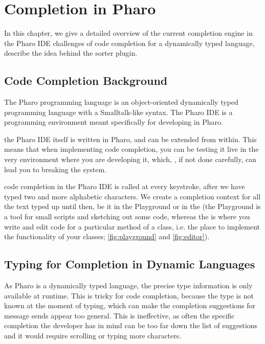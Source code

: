 \chapter{Completion in Pharo}
\label{chap:PharoCompletion}

In this chapter, we give a detailed overview of  the current completion engine in the Pharo IDE challenges of code completion for a dynamically typed language,  describe the idea behind the sorter plugin.

\section{Code Completion Background}
\label{sec:PharoCompletion-Background}
 The Pharo programming language is an object-oriented dynamically typed programming language with a Smalltalk-like syntax. The Pharo IDE is a programming environment meant specifically for developing in Pharo. 

the Pharo IDE itself is written in Pharo, and can be extended from within. This means that when implementing code completion, you can be testing it live in the very environment where you are developing it, which, , if not done carefully, can lead you to breaking the system. 

 code completion in the Pharo IDE is called at every keystroke, after we have typed two and more alphabetic characters. We create a completion context for all the text typed up until then, be it in the Playground or in the  (the Playground is a tool for  small scripts and sketching out some code, whereas the  is where you write and edit code for a particular method of a class, i.e. the place to implement the functionality of your classes;  \ref{fig:playground} and \ref{fig:editor}).

\section{Typing for Completion in Dynamic Languages}
\label{sec:PharoCompletion-Typing}
As Pharo is a dynamically typed language, the precise type information is only available at runtime. This is  tricky for code completion, because the type is not known at the moment of typing, which can make the completion suggestions for message sends appear too general. This is ineffective, as often the specific completion the developer has in mind can be too far down  the list of suggestions and it would require scrolling  or typing more characters.

